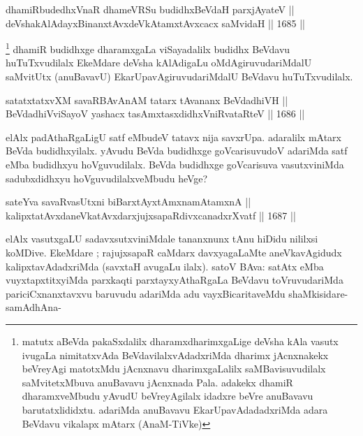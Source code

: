 
\begin{shl}
dhamiRbudedhxVnaR dhameVRSu budidhxBeVdaH parxjAyateV || \\
deVshakAlAdayxBinanxtAvxdeVkAtamxtAvxcacx saMvidaH ||  1685 ||  
\end{shl}

\begin{artha}
\footnote{matutx aBeVda pakaSxdalilx dharamxdharimxgaLige deVsha kAla vasutx ivugaLa nimitatxvAda BeVdavilalxvAdadxriMda dharimx jAcnxnakekx beVreyAgi matotxMdu jAcnxnavu dharimxgaLalilx saMBavisuvudilalx saMvitetxMbuva anuBavavu jAcnxnada Pala. adakekx dhamiR dharamxveMbudu yAvudU beVreyAgilalx idadxre beVre anuBavavu barutatxlididxtu. adariMda anuBavavu EkarUpavAdadadxriMda adara BeVdavu vikalapx mAtarx (AnaM-TiVke)}
dhamiR budidhxge dharamxgaLa viSayadalilx budidhx BeVdavu huTuTxvudilalx EkeMdare deVsha kAlAdigaLu oMdAgiruvudariMdalU saMvitUtx (anuBavavU) EkarUpavAgiruvudariMdalU BeVdavu huTuTxvudilalx.
\end{artha}


\begin{shl}
satatxtatxvXM savaRBAvAnAM tatarx tAvananx BeVdadhiVH || \\
BeVdadhiVviSayoV yashacx tasAmxtasxdidhxVniRvataRteV ||  1686 ||  
\end{shl}

\begin{artha}
elAlx padAthaRgaLigU satf eMbudeV tatavx nija savxrUpa. adaralilx mAtarx BeVda budidhxyilalx. yAvudu BeVda budidhxge goVcarisuvudoV adariMda satf eMba budidhxyu hoVguvudilalx. BeVda budidhxge goVcarisuva vasutxviniMda sadubxdidhxyu hoVguvudilalxveMbudu heVge?
\end{artha}

\begin{shl}
sateYva savaRvasUtxni biBarxtAyxtAmxnamAtamxnA || \\
kalipxtatAvxdaneVkatAvxdarxjujxsapaRdivxcanadxrXvatf ||  1687 ||  
\end{shl}

\begin{artha}
elAlx vasutxgaLU sadavxsutxviniMdale tananxnunx tAnu hiDidu nililxsi koMDive. EkeMdare ; rajujxsapaR caMdarx davxyagaLaMte aneVkavAgidudx kalipxtavAdadxriMda (savxtaH avugaLu ilalx). satoV BAva: satAtx eMba vuyxtapxtitxyiMda parxkaqti parxtayxyAthaRgaLa BeVdavu toVruvudariMda pariciCxnanxtavxvu baruvudu adariMda adu vayxBicaritaveMdu shaMkisidare- samAdhAna-
\end{artha}

